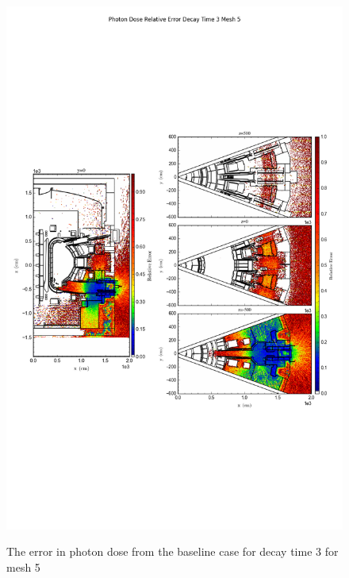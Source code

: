 \begin{figure}[ht!]
\centering
\includegraphics[trim={0cm 9cm 0cm 10cm},clip,scale=0.75]{../plots/final_model/Photon_Dose_Relative_Error_Decay_Time_3_Mesh_5.png}
\label{fig:photons_dc3_no4bc_m5_error}
\caption{The error in photon dose from the baseline case for decay time 3 for mesh 5}
\end{figure}
